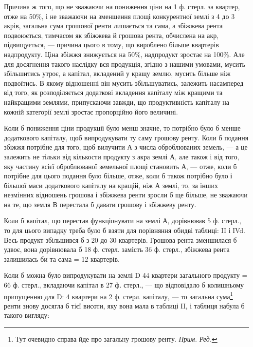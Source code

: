 
Причина ж того, що не зважаючи на пониження ціни на 1 ф. стерл.
за квартер, отже на 50\%, і не зважаючи на зменшення площі конкурентної
землі з 4 до 3 акрів, загальна сума грошової ренти лишається та сама, а збіжжева
рента подвоюється, тимчасом як збіжжева й грошова рента, обчислена на акр, підвищується,
— причина цього в тому, що вироблено більше квартерів надпродукту.
Ціна збіжжя знижується на 50\%, надпродукт зростає на 100\%.
Але для досягнення такого наслідку вся продукція, згідно з нашими умовами,
мусить збільшитись утроє, а капітал, вкладений у кращу землю, мусить більше
ніж подвоїтись. В якому відношенні він мусить збільшуватись, залежить насамперед
від того, як розподіляється додаткові вкладення капіталу між кращими та
найкращими землями, припускаючи завжди, що продуктивність капіталу на
кожній категорії землі зростає пропорційно його величині.

Коли б пониження ціни продукції було менш значне, то потрібно було б
менше додаткового капіталу, щоб випродукувати ту саму грошову ренту. Коли б
подання збіжжя потрібне для того, щоб вилучити А з числа оброблюваних земель,
— а це залежить не тільки від кількости продукту з акра землі А, але
також і від того, яку частину всієї оброблюваної земельної площі становить А, —
отже, коли б потрібне для цього подання було більше, отже, коли б також
потрібно було і більшої маси додаткового капіталу на кращій, ніж А землі, то,
за інших незмінних відношень грошова і збіжжева ренти зросли б ще більше,
не зважаючи на те, що земля В перестала б давати грошову і збіжжеву ренту.

Коли б капітал, що перестав функціонувати на землі А, дорівнював 5 ф.
стерл., то для цього випадку треба було б взяти для порівняння обидві таблиці:
II і ІVd. Весь продукт збільшився б з 20 до 30 квартерів. Грошова рента
зменшилася б удвоє, вона дорівнювала б 18 ф. стерл. замість 36 ф. стерл.,
збіжжева рента залишилась би та сама = 12 квартерів.

Коли б можна було випродукувати на землі D 44 квартери загального
продукту = 66 ф. стерл., вкладаючи капітал в 27 ф. стерл., — що відповідало б
колишньому припущенню для D: 4 квартери на 2 ф. стерл. капіталу, —
то загальна сума\footnote*{
Тут очевидно справа йде про загальну грошову ренту. \emph{Прим. Ред.}
} ренти знову досягла б тієї висоти, яку вона мала в таблиці
II, і таблиця набула б такого вигляду:

